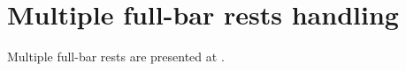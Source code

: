 
\chapter{Multiple full-bar rests handling}\label{Multiple full-bar rests handling}

Multiple full-bar rests are presented at .


